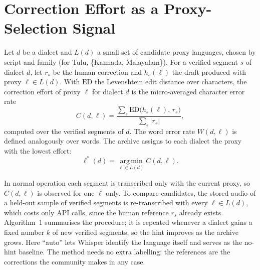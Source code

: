 \documentclass[conference]{IEEEtran}
\begin{document}
\section{Correction Effort as a Proxy-Selection Signal}\label{sec:method}
Let $d$ be a dialect and $L(d)$ a small set of candidate proxy languages, chosen by script and family (for Tulu, \{Kannada, Malayalam\}). For a verified segment $s$ of dialect $d$, let $r_s$ be the human correction and $h_s(\ell)$ the draft produced with proxy $\ell \in L(d)$. With $\mathrm{ED}$ the Levenshtein edit distance \cite{levenshtein1966} over characters, the correction effort of proxy $\ell$ for dialect $d$ is the micro-averaged character error rate
\begin{equation}
C(d,\ell) = \frac{\sum_{s} \mathrm{ED}\big(h_s(\ell),\, r_s\big)}{\sum_{s} |r_s|},
\label{eq:cer}
\end{equation}
computed over the verified segments of $d$. The word error rate $W(d,\ell)$ is defined analogously over words. The archive assigns to each dialect the proxy with the lowest effort:
\begin{equation}
\ell^{*}(d) = \operatorname*{arg\,min}_{\ell \in L(d)} C(d,\ell).
\label{eq:argmin}
\end{equation}

In normal operation each segment is transcribed only with the current proxy, so $C(d,\ell)$ is observed for one $\ell$ only. To compare candidates, the stored audio of a held-out sample of verified segments is re-transcribed with every $\ell \in L(d)$, which costs only API calls, since the human reference $r_s$ already exists. Algorithm~1 summarises the procedure; it is repeated whenever a dialect gains a fixed number $k$ of new verified segments, so the hint improves as the archive grows. Here ``auto'' lets Whisper identify the language itself and serves as the no-hint baseline. The method needs no extra labelling: the references are the corrections the community makes in any case.
\end{document}
